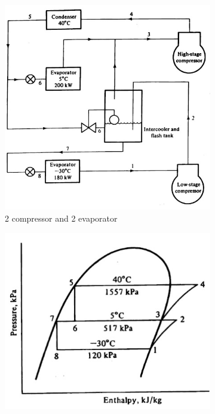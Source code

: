\documentclass{article}
\begin{document}
\begin{figure}[H]
  \centering
  
  \begin{subfigure}{0.3\textwidth}
      \includegraphics[width=\textwidth]{img/two_com_2_evap.jpeg}
      \caption{2 compressor and 2 evaporator}
      \label{subfig:2_compressor_2_evaporator}
  \end{subfigure}\hfill
  \begin{subfigure}{0.3\textwidth}
      \includegraphics[width=\textwidth]{img/two_com_2_evap_phase_dia.jpeg}

\end{subfigure}
\end{figure}
\end{document}
